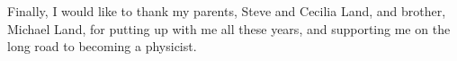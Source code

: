 \documentclass[12pt,letterpaper,oldfontcommands]{ucbthesis}
\begin{document}
\begin{frontmatter}
\begin{acknowledgements}
Finally, I would like to thank my parents, Steve and Cecilia Land, and brother, Michael Land, for putting up with me all these years, and supporting me on the long road to becoming a physicist.

\end{acknowledgements}

\end{frontmatter}

\pagestyle{headings}








\appendix






\printbibliography
\end{document}
